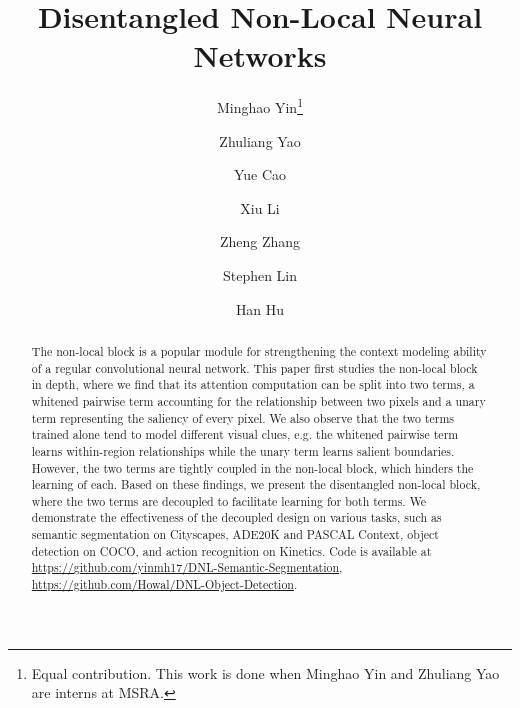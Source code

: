 \documentclass[runningheads]{llncs}
\begin{document}
\pagestyle{headings}
\mainmatter


\title{Disentangled Non-Local Neural Networks}

\begin{comment}
\titlerunning{ECCV-20 submission ID \ECCVSubNumber}
\authorrunning{ECCV-20 submission ID \ECCVSubNumber}
\author{Anonymous ECCV submission}
\institute{Paper ID \ECCVSubNumber}
\end{comment}


\author{Minghao Yin\thanks{Equal contribution. This work is done when Minghao Yin and Zhuliang Yao are interns at MSRA.} \and
Zhuliang Yao \and
Yue Cao  \and Xiu Li \and Zheng Zhang \and Stephen Lin \and Han Hu}
\maketitle



\begin{abstract}

The non-local block is a popular module for strengthening the context modeling ability of a regular convolutional neural network. This paper first studies the non-local block in depth, where we find that its attention computation can be split into two terms, a whitened pairwise term accounting for the relationship between two pixels and a unary term representing the saliency of every pixel. We also observe that the two terms trained alone tend to model different visual clues, e.g. the whitened pairwise term learns within-region relationships while the unary term learns salient boundaries. However, the two terms are tightly coupled in the non-local block, which hinders the learning of each. Based on these findings, we present the disentangled non-local block, where the two terms are decoupled to facilitate learning for both terms. We demonstrate the effectiveness of the decoupled design on various tasks, such as semantic segmentation on Cityscapes, ADE20K and PASCAL Context, object detection on COCO, and action recognition on Kinetics. Code is available at \\\url{https://github.com/yinmh17/DNL-Semantic-Segmentation}, \\ \url{https://github.com/Howal/DNL-Object-Detection}.

\end{abstract}
\end{document}
